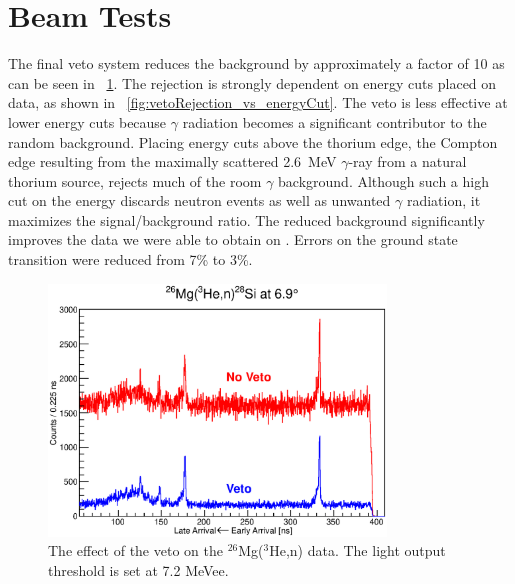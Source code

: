 \section{Beam Tests}

The final veto system reduces the background by approximately a factor of 10 as can be seen in {\fig}~\ref{fig:veto_26Mg}.  The rejection is strongly dependent on energy cuts placed on data, as shown in {\fig}~\ref{fig:vetoRejection_vs_energyCut}.  The veto is less effective at lower energy cuts because $\gamma$ radiation becomes a significant contributor to the random background.  Placing energy cuts above the thorium edge, the Compton edge resulting from the maximally scattered 2.6~MeV $\gamma$-ray \cite{PDG} from a natural thorium source, rejects much of the room $\gamma$ background.  Although such a high cut on the energy discards neutron events as well as unwanted $\gamma$ radiation, it maximizes the signal/background ratio.  The reduced background significantly improves the data we were able to obtain on \MgReaction.  Errors on the ground state transition were reduced from 7\% to 3\%.
\begin{figure}[!htbp]
\centering
\includegraphics[width=0.8\textwidth]{figures/26Mg_vetoEffect.eps}
\caption{\label{fig:vetoData}The effect of the veto on the $^{26}$Mg($^3$He,n) data.  The light output threshold is set at 7.2 MeVee.}
\label{fig:veto_26Mg}
\end{figure}
  


